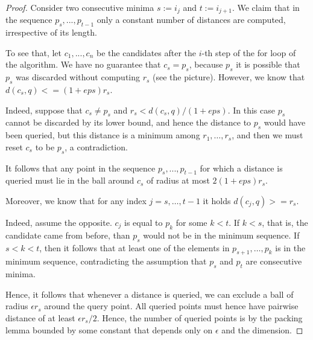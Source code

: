 \documentclass[a4paper,USenglish]{socg-lipics-v2018}
\newcommand{\eps}{\epsilon}
\begin{document}
\begin{algorithmic}
\begin{proof}
    Consider two consecutive minima  $s:=i_j$ and $t:=i_{j+1}$. We claim that in the sequence
$p_s,...,p_{t-1}$
only a constant number of distances are computed, irrespective of its length.

To see that, let $c_1,...,c_n$ be the candidates after the $i$-th step of
the for loop of the algorithm. We have no guarantee that $c_s=p_s$, because $p_s$ it is possible
    that $p_s$ was discarded without computing $r_s$ (see the picture). However, we know that
$d(c_s,q)<=(1+eps) r_s$.

Indeed, suppose that $c_s \neq p_s$ and $r_s < d(c_s,q)/(1+eps)$. In this
    case $p_s$ cannot be discarded 
by its lower bound, and hence the distance to $p_s$ would
have been queried, but this distance is a minimum among $r_1, \dots, r_s$,
    and then we must reset $c_s$ to be $p_s$, a contradiction.

It follows that any point in the sequence $p_s,...,p_{t-1}$ for which a
distance is queried must lie in the ball around $c_s$ of radius at most $2(1+eps)r_s$.

Moreover, we know that for any index $j=s,\dots, t-1$ it holds
$d(c_j,q)>=r_s$.

Indeed, assume the opposite. $c_j$ is equal to $p_k$ for some $k<t$. If $k<s$,
that is, the candidate came from before, than $p_s$ would not be in the
minimum sequence. If $s<k<t$, then it follows that at least one of the
elements in $p_{s+1},\dots,p_k$ is in the minimum sequence, contradicting
the assumption that $p_s$ and $p_t$ are consecutive minima.

Hence, it follows that whenever a distance is queried, we can exclude a
ball of radius $\eps r_s$ around the query point. All queried points must
hence have pairwise distance of at least $ \eps r_s / 2$. Hence, the number of
queried points is by the packing lemma bounded by some constant that depends only on $\eps$ and the dimension. 
\end{proof}






\end{algorithmic}
\end{document}
